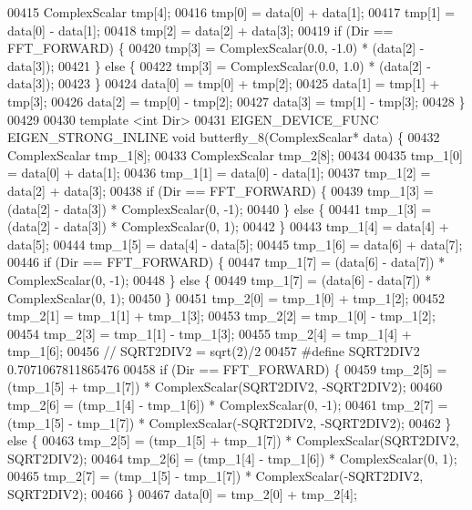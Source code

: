 \begin{DoxyCode}
00415     ComplexScalar tmp[4];
00416     tmp[0] = data[0] + data[1];
00417     tmp[1] = data[0] - data[1];
00418     tmp[2] = data[2] + data[3];
00419     \textcolor{keywordflow}{if} (Dir == FFT\_FORWARD) \{
00420       tmp[3] = ComplexScalar(0.0, -1.0) * (data[2] - data[3]);
00421     \} \textcolor{keywordflow}{else} \{
00422       tmp[3] = ComplexScalar(0.0, 1.0) * (data[2] - data[3]);
00423     \}
00424     data[0] = tmp[0] + tmp[2];
00425     data[1] = tmp[1] + tmp[3];
00426     data[2] = tmp[0] - tmp[2];
00427     data[3] = tmp[1] - tmp[3];
00428   \}
00429 
00430   \textcolor{keyword}{template} <\textcolor{keywordtype}{int} Dir>
00431   EIGEN\_DEVICE\_FUNC EIGEN\_STRONG\_INLINE \textcolor{keywordtype}{void} butterfly\_8(ComplexScalar* data) \{
00432     ComplexScalar tmp\_1[8];
00433     ComplexScalar tmp\_2[8];
00434 
00435     tmp\_1[0] = data[0] + data[1];
00436     tmp\_1[1] = data[0] - data[1];
00437     tmp\_1[2] = data[2] + data[3];
00438     \textcolor{keywordflow}{if} (Dir == FFT\_FORWARD) \{
00439       tmp\_1[3] = (data[2] - data[3]) * ComplexScalar(0, -1);
00440     \} \textcolor{keywordflow}{else} \{
00441       tmp\_1[3] = (data[2] - data[3]) * ComplexScalar(0, 1);
00442     \}
00443     tmp\_1[4] = data[4] + data[5];
00444     tmp\_1[5] = data[4] - data[5];
00445     tmp\_1[6] = data[6] + data[7];
00446     \textcolor{keywordflow}{if} (Dir == FFT\_FORWARD) \{
00447       tmp\_1[7] = (data[6] - data[7]) * ComplexScalar(0, -1);
00448     \} \textcolor{keywordflow}{else} \{
00449       tmp\_1[7] = (data[6] - data[7]) * ComplexScalar(0, 1);
00450     \}
00451     tmp\_2[0] = tmp\_1[0] + tmp\_1[2];
00452     tmp\_2[1] = tmp\_1[1] + tmp\_1[3];
00453     tmp\_2[2] = tmp\_1[0] - tmp\_1[2];
00454     tmp\_2[3] = tmp\_1[1] - tmp\_1[3];
00455     tmp\_2[4] = tmp\_1[4] + tmp\_1[6];
00456 \textcolor{comment}{// SQRT2DIV2 = sqrt(2)/2}
00457 \textcolor{preprocessor}{#define SQRT2DIV2 0.7071067811865476}
00458     \textcolor{keywordflow}{if} (Dir == FFT\_FORWARD) \{
00459       tmp\_2[5] = (tmp\_1[5] + tmp\_1[7]) * ComplexScalar(SQRT2DIV2, -SQRT2DIV2);
00460       tmp\_2[6] = (tmp\_1[4] - tmp\_1[6]) * ComplexScalar(0, -1);
00461       tmp\_2[7] = (tmp\_1[5] - tmp\_1[7]) * ComplexScalar(-SQRT2DIV2, -SQRT2DIV2);
00462     \} \textcolor{keywordflow}{else} \{
00463       tmp\_2[5] = (tmp\_1[5] + tmp\_1[7]) * ComplexScalar(SQRT2DIV2, SQRT2DIV2);
00464       tmp\_2[6] = (tmp\_1[4] - tmp\_1[6]) * ComplexScalar(0, 1);
00465       tmp\_2[7] = (tmp\_1[5] - tmp\_1[7]) * ComplexScalar(-SQRT2DIV2, SQRT2DIV2);
00466     \}
00467     data[0] = tmp\_2[0] + tmp\_2[4];

\end{DoxyCode}
